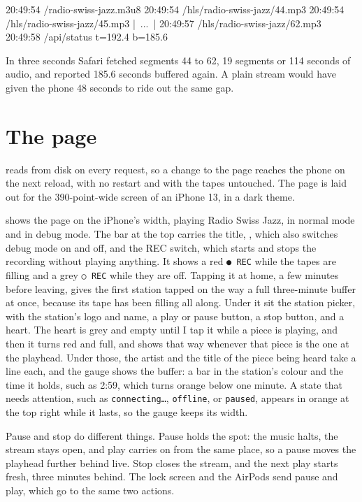 \documentclass[11pt,a4paper]{article}
\begin{document}
\begin{cmdout}
20:49:54 /radio-swiss-jazz.m3u8
20:49:54 /hls/radio-swiss-jazz/44.mp3
20:49:54 /hls/radio-swiss-jazz/45.mp3
|~...~|
20:49:57 /hls/radio-swiss-jazz/62.mp3
20:49:58 /api/status t=192.4 b=185.6
\end{cmdout}

In three seconds Safari fetched segments 44 to 62, 19 segments or 114 seconds of audio, and reported 185.6 seconds buffered again. A plain stream would have given the phone 48 seconds to ride out the same gap.

\section*{The page}

 reads  from disk on every request, so a change to the page reaches the phone on the next reload, with no restart and with the tapes untouched. The page is laid out for the 390-point-wide screen of an iPhone 13, in a dark theme.

 shows the page on the iPhone's width, playing Radio Swiss Jazz, in normal mode and in debug mode. The bar at the top carries the title, , which also switches debug mode on and off, and the REC switch, which starts and stops the recording without playing anything. It shows a red \texttt{● REC} while the tapes are filling and a grey \texttt{○ REC} while they are off. Tapping it at home, a few minutes before leaving, gives the first station tapped on the way a full three-minute buffer at once, because its tape has been filling all along. Under it sit the station picker, with the station's logo and name, a play or pause button, a stop button, and a heart. The heart is grey and empty until I tap it while a piece is playing, and then it turns red and full, and shows that way whenever that piece is the one at the playhead. Under those, the artist and the title of the piece being heard take a line each, and the gauge shows the buffer: a bar in the station's colour and the time it holds, such as 2:59, which turns orange below one minute. A state that needs attention, such as \texttt{connecting…}, \texttt{offline}, or \texttt{paused}, appears in orange at the top right while it lasts, so the gauge keeps its width.

Pause and stop do different things. Pause holds the spot: the music halts, the stream stays open, and play carries on from the same place, so a pause moves the playhead further behind live. Stop closes the stream, and the next play starts fresh, three minutes behind. The lock screen and the AirPods send pause and play, which go to the same two actions.
\end{document}
